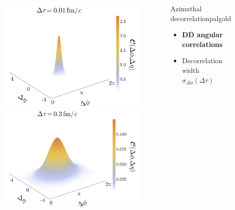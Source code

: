 \documentclass[aspectratio=169,11pt,usenames,dvipsnames]{beamer}
\begin{document}
\begin{frame}
\begin{center}
\begin{columns}[onlytextwidth,t]
\begin{center}
                \begin{figure}
                    \centering
                    \includegraphics[width=0.5\columnwidth]
                    {images/paper_Cdetadphi_3D_toy_charm_pT_1_tau_0.01_v2.png}\hfill
                    \includegraphics[width=0.5\columnwidth]
                    {images/paper_Cdetadphi_3D_toy_charm_pT_1_tau_0.3_v2.png}
                \end{figure}
            \end{center}
            \begin{center}
                \begin{custombox2}{\normalsize Azimuthal decorrelation}{palgold}
                    \small
                    \begin{varwidth}{0.98\textwidth}
                    \begin{itemize}\itemsep0em 
                        \itemsep0em
                        \footnotesize
                        \item {\bfseries\color{palgold}$\boldsymbol{D\overline{D}}$ angular correlations}
                        \item Decorrelation width $\sigma_{\Delta\phi}(\Delta\tau)$
                    \end{itemize}
                    \end{varwidth}
                \end{custombox2}


\end{center}
\end{columns}
\end{center}
\end{frame}
\end{document}
